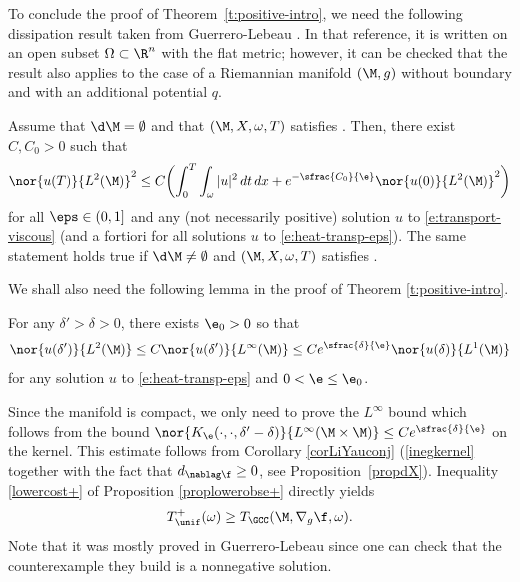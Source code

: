 To conclude the proof of Theorem~\ref{t:positive-intro}, we need the following dissipation result taken from Guerrero-Lebeau \cite{GL:07}. In that reference, it is written on an open subset $\Omega \subset \R^n$ with the flat metric; however, it can be checked that the result also applies to the case of a Riemannian manifold $(\M,g)$ without boundary and with an additional potential $q$.
\begin{proposition}[Proposition 3 of \cite{GL:07}, $m=1$]
\label{p:guerrero-lebeau}
Assume that $\d\M=\emptyset$ and that $(\M,X,\omega,T)$ satisfies \pGCC. Then, there exist $C,C_0>0$ such that
\begin{equation}
\label{dissip}
\nor{u(T)}{L^{2}(\M)}^2 \leq C \biggl(\int_{0}^{T}\int_{\omega}|u|^{2}\,dt\,dx+e^{-\sfrac{C_{0}}{\e}} \nor{u(0)}{L^{2}(\M)}^2 \biggr)
\end{equation}
for all $\eps \in (0,1]$ and any (not necessarily positive) solution $u$ to \eqref{e:transport-viscous} (and a fortiori for all solutions $u$ to \eqref{e:heat-transp-eps}).
The same statement holds true if $\d\M\neq\emptyset$ and $(\M,X,\omega,T)$ satisfies \pFC.
\end{proposition}

We shall also need the following lemma in the proof of Theorem \ref{t:positive-intro}.
\begin{lemma}
\label{lmregular}
For any $\delta'>\delta>0$, there exists $\e_{0}>0$ so that
\begin{equation}
\label{regulL1L2}
\nor{u(\delta')}{L^{2}(\M)}\leq C \nor{u(\delta')}{L^{\infty}(\M)}\leq Ce^{\sfrac{\delta}{\e}} \nor{u(\delta)}{L^{1}(\M)}
\end{equation}
for any solution $u$ to \eqref{e:heat-transp-eps} and $0<\e\leq \e_{0}$.
\end{lemma}
\bnp
Since the manifold is compact, we only need to prove the $L^{\infty}$ bound which follows from the bound $\nor{K_{\e}(\cdot,\cdot,\delta' -\delta)}{L^{\infty}(\M \times \M)}\leq Ce^{\sfrac{\delta}{\e}} $ on the kernel. This estimate follows from Corollary \ref{corLiYauconj} (\eg \eqref{inegkernel} together with the fact that $d_{\nablag \f} \geq0$, see Proposition~\ref{propdX}).
\enp
{}
Inequality \eqref{lowercost+} of Proposition \ref{proplowerobse+} directly yields
\[
T_{\unif}^{+}(\omega)\geq T_{\GCC}(\M, \nabla_g\f, \omega).
\]
Note that it was mostly proved in Guerrero-Lebeau \cite[Th.\,1]{GL:07} since one can check that the counterexample they build is a nonnegative solution.

